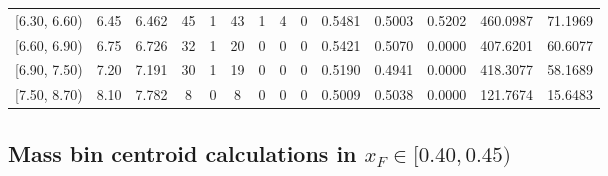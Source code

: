 \begin{table}[htbp]
{\begin{tabular}{cc|c|cccccc|ccc|cc}
        {[6.30, 6.60)} & 6.45 & 6.462 & 45 & 1 & 43 & 1 & 4 & 0 & 0.5481 & 0.5003 & 0.5202 & 460.0987 & 71.1969 \\
        {[6.60, 6.90)} & 6.75 & 6.726 & 32 & 1 & 20 & 0 & 0 & 0 & 0.5421 & 0.5070 & 0.0000 & 407.6201 & 60.6077 \\
        {[6.90, 7.50)} & 7.20 & 7.191 & 30 & 1 & 19 & 0 & 0 & 0 & 0.5190 & 0.4941 & 0.0000 & 418.3077 & 58.1689 \\
        {[7.50, 8.70)} & 8.10 & 7.782 & 8 & 0 & 8 & 0 & 0 & 0 & 0.5009 & 0.5038 & 0.0000 & 121.7674 & 15.6483 \\
        \hline\hline
    \end{tabular}
    }
\end{table}

\clearpage
\subsection{\texorpdfstring{Mass bin centroid calculations in $x_F \in [0.40, 0.45)$}{Mass bin centroid calculations in x\_F in [0.40, 0.45)]}}

